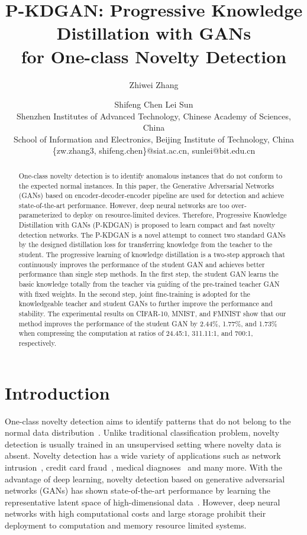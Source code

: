 \documentclass{article}
\title{P-KDGAN: Progressive Knowledge Distillation with GANs \\ for One-class Novelty Detection}
\author{
Zhiwei Zhang\footnotemark[1]\and
Shifeng Chen\footnotemark[2]\And
Lei Sun \\
\affiliations
Shenzhen Institutes of Advanced Technology, Chinese Academy of Sciences, China \\
School of Information and Electronics, Beijing Institute of Technology, China \\
\emails
\{zw.zhang3, shifeng.chen\}@siat.ac.cn,
sunlei@bit.edu.cn
}
\begin{document}
	\maketitle


\begin{abstract}
		One-class novelty detection is to identify anomalous instances that do not conform to the expected normal instances. In this paper, the Generative Adversarial Networks (GANs) based on encoder-decoder-encoder pipeline are used for detection and achieve state-of-the-art performance. However, deep neural networks are too over-parameterized to deploy on resource-limited devices. Therefore, Progressive Knowledge Distillation with GANs (P-KDGAN) is proposed to learn compact and fast novelty detection networks. The P-KDGAN is a novel attempt to connect two standard GANs by the designed distillation loss for transferring knowledge from the teacher to the student. The progressive learning of knowledge distillation is a two-step approach that continuously improves the performance of the student GAN and achieves better performance than single step methods. In the first step, the student GAN learns the basic knowledge totally from the teacher via guiding of the pre-trained teacher GAN with fixed weights. In the second step, joint fine-training is adopted for the knowledgeable teacher and student GANs to further improve the performance and stability. The experimental results on CIFAR-10, MNIST, and FMNIST show that our method improves the performance of the student GAN by 2.44\%, 1.77\%, and 1.73\% when compressing the computation at ratios of 24.45:1, 311.11:1, and 700:1, respectively.
	\end{abstract}
	
	
	\renewcommand{\thefootnote}{\fnsymbol{footnote}}
	
	
\section{Introduction}
	One-class novelty detection aims to identify patterns that do not belong to the normal data distribution~\cite{survey:2009}. Unlike traditional classification problem, novelty detection is usually trained in an unsupervised setting where novelty data is absent. Novelty detection has a wide variety of applications such as network intrusion~\cite{intrusion:2009}, credit card fraud~\cite{fraud:2008}, medical diagnoses~\cite{AnoGAN:2017} and many more. With the advantage of deep learning, novelty detection based on generative adversarial networks (GANs) has shown state-of-the-art performance by learning the representative latent space of high-dimensional data~\cite{AnoGAN:2017,EfficientGAN:2018,OCGAN:2019}. However, deep neural networks with high computational costs and large storage prohibit their deployment to computation and memory resource limited systems.
	
\end{document}
